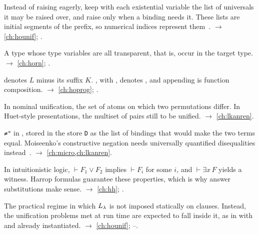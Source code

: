 \begin{glossarylist}
\item[Delayed raising] Instead of raising eagerly, keep with each existential variable the list of universals it
  may be raised over, and raise only when a binding needs it. These lists are initial segments of the prefix, so
  numerical indices represent them~\cite{NadathurLinnell2005}. $\rightarrow$ \cref{ch:hounif}; .
\item[Determinate type] A type whose type variables are all transparent, that is, occur in the target type.
  $\rightarrow$ \cref{ch:horn}; .
\item[Difference list, functional difference list]  denotes $L$ minus its suffix $K$.
  , with , denotes , and appending is function composition.
  $\rightarrow$ \cref{ch:hoprog}; .
\item[Disagreement set] In nominal unification, the set of atoms on which two permutations differ. In Huet-style
  presentations, the multiset of pairs still to be unified. $\rightarrow$ \cref{ch:lkanren}.
\item[Disequality constraint] \texttt{≠°} in \micro{}, stored in the store \texttt{D} as the list of bindings that
  would make the two terms equal. Moiseenko's constructive negation needs universally quantified disequalities
  instead~\cite{Moiseenko2019}. $\rightarrow$ \cref{ch:micro,ch:lkanren}.
\item[Disjunction / existence property] In intuitionistic logic, $\vdash F_1\vee F_2$ implies $\vdash F_i$ for
  some $i$, and $\vdash\exists x\,F$ yields a witness. Harrop formulas guarantee these properties, which is why
  answer substitutions make sense. $\rightarrow$ \cref{ch:hh}; .
\item[Dynamic $\Llam$] The practical regime in which $\Llam$ is not imposed statically on clauses. Instead, the
  unification problems met at run time are expected to fall inside it, as in  with 
  and  already instantiated. $\rightarrow$ \cref{ch:hounif}; --.
\end{glossarylist}

